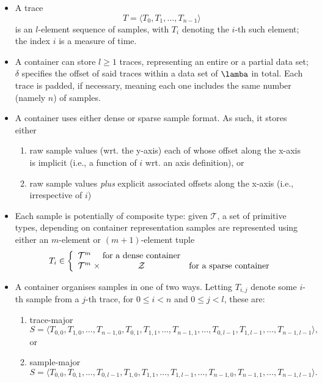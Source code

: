 \documentclass[10pt,a4paper]{llncs}
\begin{document}
\begin{itemize}
\item A trace 
      \[
      T = \langle T_0, T_1, \ldots, T_{n-1} \rangle
      \]
      is an $l$-element sequence of samples, with $T_i$ denoting the $i$-th 
      such element; the index $i$ is a measure of time.
\item A container can store $l \geq 1$ traces, representing an entire or a
      partial data set; $\delta$ specifies the offset of said traces within 
      a data set of $\lamba$ in total.  Each trace is padded, if necessary, 
      meaning each one includes the same number (namely $n$) of samples.
\item A container uses either dense or sparse sample format.  As such, it 
      stores either

      \begin{enumerate}      
      \item raw sample values (wrt. the y-axis) each of whose offset along 
            the x-axis is implicit (i.e., a function of $i$ wrt. an axis 
            definition),
            or
      \item raw sample values {\em plus} explicit associated offsets along 
            the x-axis (i.e., irrespective of $i$)
      \end{enumerate}      

\item Each sample is potentially of composite type: given ${\mathcal T}$, a
      set of primitive types, depending on container representation samples
      are represented using either an $m$-element or $(m+1)$-element tuple
      \[
      T_i \in \left\{
              \begin{array}{c@{\;}c@{\;}cl}
              {\mathcal T}^m &                     & \mbox{for a dense  container} \\
              {\mathcal T}^m &\times& {\mathcal Z} & \mbox{for a sparse container} \\
              \end{array}
              \right.
      \]
\item A container organises samples in one of two ways.  Letting $T_{i,j}$ 
      denote some $i$-th sample from a $j$-th trace, for $0 \leq i < n$ and 
      $0 \leq j < l$, these are:

      \begin{enumerate}
      \item trace-major 
            \[
            S = \langle T_{  0,  0}, T_{  1,  0}, \ldots, T_{n-1,  0},
                        T_{  0,  1}, T_{  1,  1}, \ldots, T_{n-1,  1},
                                                  \ldots,
                        T_{  0,l-1}, T_{  1,l-1}, \ldots, T_{n-1,l-1} \rangle ,
            \]
            or
      \item sample-major
            \[
            S = \langle T_{  0,  0}, T_{  0,  1}, \ldots, T_{  0,l-1},
                        T_{  1,  0}, T_{  1,  1}, \ldots, T_{  1,l-1},
                                                  \ldots,
                        T_{n-1,  0}, T_{n-1,  1}, \ldots, T_{n-1,l-1} \rangle .
            \]
      \end{enumerate}


\end{itemize}
\end{document}
